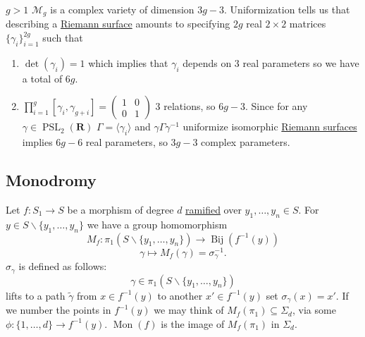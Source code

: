 \documentclass[10pt,]{book}
\numberwithin{equation}{section}
\newcommand{\inv}{^{-1}}
\newcommand{\lb}{[}
\newcommand{\rb}{]}
\newcommand{\RR}{\mathbf{R}}
\DeclareMathOperator{\PSL}{PSL}
\newcommand{\gt}{>}
\newcommand{\amp}{&}
\begin{document}
\hypertarget{p-577}{}%
\(g \gt 1\) \(\mathcal M_g\) is a complex variety of dimension \(3g-3\). Uniformization tells us that describing a \hyperref[def-top-riem-surface]{Riemann surface} amounts to specifying \(2g\) real \(2\times 2\) matrices \(\{\gamma_i\}_{i=1}^{2g}\) such that\leavevmode%
\begin{enumerate}
\item\hypertarget{li-109}{}\(\det(\gamma_i) = 1\) which implies that \(\gamma_i\) depends on 3 real parameters so we have a total of \(6g\).%
\item\hypertarget{li-110}{}\(\prod_{i=1}^g \lb \gamma_i, \gamma_{g+i}\rb = \begin{pmatrix} 1\amp 0 \\ 0\amp 1\end{pmatrix}\) 3 relations, so \(6g- 3\). Since for any \(\gamma \in \PSL_2(\RR)\) \(\Gamma = \langle \gamma_i \rangle\) and \(\gamma\Gamma \gamma\inv\) uniformize isomorphic \hyperref[def-top-riem-surface]{Riemann surfaces} implies \(6g-6\) real parameters, so \(3g-3\) complex parameters.%
\end{enumerate}
%
%
%
\typeout{************************************************}
\typeout{************************************************}
%
\subsection[{Monodromy}]{Monodromy}\label{subsection-50}
\hypertarget{p-578}{}%
Let \(f\colon S_1 \to S\) be a morphism of degree \(d\) \hyperref[def-dess-ramified]{ramified} over \(y_1,\ldots, y_n \in S\). For \(y\in S\smallsetminus \{y_1,\ldots, y_n\}\) we have a group homomorphism%
\begin{equation*}
M_f\colon \pi_1(S \smallsetminus \{y_1, \ldots, y_n\} )\to \operatorname{Bij} (f\inv (y))
\end{equation*}
%
\begin{equation*}
\gamma \mapsto M_f(\gamma) = \sigma_\gamma\inv\text{.}
\end{equation*}
\(\sigma_\gamma\) is defined as follows:%
\begin{equation*}
\gamma \in \pi_1(S\smallsetminus \{ y_1,\ldots, y_n\})
\end{equation*}
lifts to a path \(\widetilde \gamma\) from \(x\in f\inv(y)\) to another \(x' \in f\inv(y)\) set \(\sigma_\gamma(x) =x'\). If we number the points in \(f\inv (y)\) we may think of \(M_f(\pi_1)\subseteq \Sigma_d\), via some \(\phi\colon \{1,\ldots, d\}\to f\inv (y)\). \(\operatorname{Mon}(f)\) is the image of \(M_f(\pi_1)\) in \(\Sigma_d\).%
%
%
\typeout{************************************************}
\typeout{************************************************}
%
\end{document}

